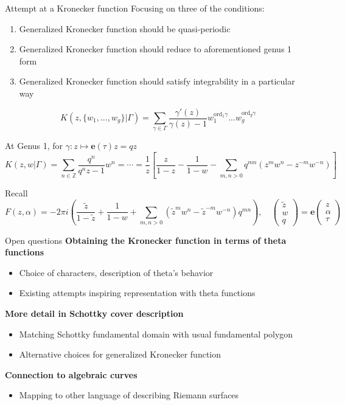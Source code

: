 \documentclass[11pt,aspectratio=169]{beamer}
\newcommand{\ee}[0]{\mathbf{e}}
\begin{document}
\begin{frame}{Attempt at a Kronecker function}{\tiny \cite{Cha22}}
    Focusing on three of the conditions:
    \begin{enumerate}
        \item Generalized Kronecker function should be quasi-periodic
        \item Generalized Kronecker function should reduce to aforementioned genus 1 form
        \item Generalized Kronecker function should satisfy integrability in a particular way
    \end{enumerate}

    \pause{}

    \[K(z,\{w_1,...,w_g\}|\Gamma) = \sum_{\gamma \in \Gamma} \frac{\gamma'(z)}{\gamma(z)-1} w_1^{\mathrm{ord}_1\gamma}...w_g^{\mathrm{ord}_g\gamma}\]
    
    \pause{}

    At Genus 1, for $\gamma : z \mapsto \ee(\tau) z = qz$
    \[K(z,w|\Gamma) = \sum_{n \in \mathbb Z} \frac{q^n}{q^n z - 1} w^n = \cdots = \frac{1}{z} \left[\frac{z}{1-z} - \frac{1}{1-w} - \sum_{m,n > 0} q^{mn} (z^m w^n - z^{-m} w^{-n})\right]\]
    
    \pause{}
    
    Recall
    \[F(z,\alpha) = -2\pi i \left(\frac{\tilde z}{1-\tilde z} + \frac{1}{1-w} + \sum_{m,n > 0} (\tilde z^m w^n - \tilde z^{-m} w^{-n}) q^{mn}\right) , \quad \begin{pmatrix} \tilde z \\ w \\ q \end{pmatrix} = \ee \begin{pmatrix}z \\ \alpha \\ \tau\end{pmatrix}\]
\end{frame}

\begin{frame}{Open questions}
    \textbf{Obtaining the Kronecker function in terms of theta functions}
    \begin{itemize}
        \item Choice of characters, description of theta's behavior
        \item Existing attempts inspiring representation with theta functions
    \end{itemize}

    \textbf{More detail in Schottky cover description}
    \begin{itemize}
        \item Matching Schottky fundamental domain with usual fundamental polygon
        \item Alternative choices for generalized Kronecker function
    \end{itemize}

    \textbf{Connection to algebraic curves}
    \begin{itemize}
        \item Mapping to other language of describing Riemann surfaces
    \end{itemize}
\end{frame}
\end{document}

